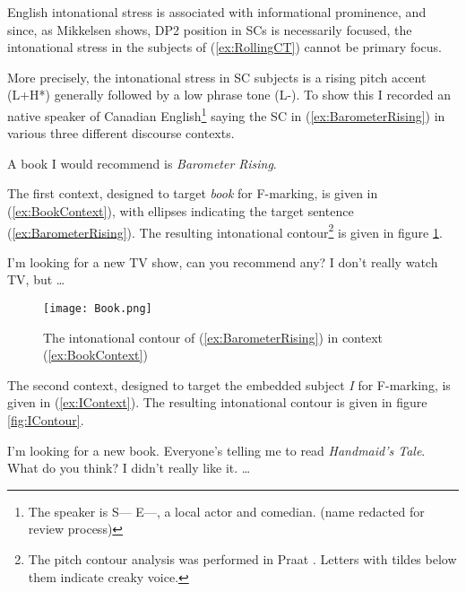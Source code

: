 \documentclass[
]{RCL}
\begin{document}
English intonational stress is associated with informational prominence, and since, as Mikkelsen shows, DP2 position in SCs is necessarily focused, the intonational stress in the subjects of (\ref{ex:RollingCT}) cannot be primary focus.

More precisely, the intonational stress in SC subjects is a rising pitch accent (L+H*) generally followed by a low phrase tone (L-).
To show this I recorded an native speaker of Canadian English\footnote{
	The speaker is  S--- E---, a local actor and comedian. (name redacted for review process)
} saying the SC in (\ref{ex:BarometerRising}) in various three different discourse contexts.
\begin{exe}
	\ex \label{ex:BarometerRising} A book I would recommend is \textit{Barometer Rising}.
\end{exe}

The first context, designed to target \textit{book} for F-marking, is given in (\ref{ex:BookContext}), with ellipses indicating the target sentence (\ref{ex:BarometerRising}).
The resulting intonational contour\footnote{
	The pitch contour analysis was performed in Praat \citep{praat}.
	Letters with tildes below them indicate creaky voice.
} is given in figure \ref{fig:BookContour}.
\begin{exe}
\ex\label{ex:BookContext}
\begin{xlist}
	 I'm looking for a new TV show, can you recommend any?
	 I don't really watch TV, but \dots
\end{xlist}
\end{exe}
\begin{figure}[h]
	\centering
	\texttt{[image: Book.png]}
	\caption{The intonational contour of (\ref{ex:BarometerRising}) in context (\ref{ex:BookContext})}
	\label{fig:BookContour}
\end{figure}
\FloatBarrier
The second context, designed to target the embedded subject \textit{I} for F-marking, is given in (\ref{ex:IContext}).
The resulting intonational contour is given in figure \ref{fig:IContour}.
\begin{exe}
\ex\label{ex:IContext}
\begin{xlist}
	 I'm looking for a new book. Everyone's telling me to read \textit{Handmaid's Tale}. What do you think?
	 I didn't really like it. \dots
\end{xlist}	
\end{exe}
\end{document}
